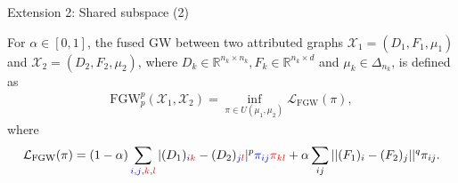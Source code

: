 \documentclass{beamer}
\newcommand{\fgw}{\text{FGW}}
\newcommand{\cX}{\mathcal X}
\newcommand{\cL}{\mathcal L}
\newcommand{\bbR}{\mathbb R}
\begin{document}
\begin{frame}{Extension 2: Shared subspace (2)}
  \scriptsize
  \begin{definition}
    For $\alpha \in [0, 1]$, the fused GW between two attributed graphs
    $\cX_1 = (D_1, F_1, \mu_1)$ and $\cX_2 = (D_2, F_2, \mu_2)$,
    where $D_k \in \bbR^{n_k \times n_k}, F_k \in \bbR^{n_k \times d}$
    and $\mu_k \in \Delta_{n_k}$, is defined as
    \begin{align*}
      \fgw_p^p(\cX_1, \cX_2) = \inf_{\pi \in U(\mu_1, \mu_2)} \cL_{\fgw}(\pi),
    \end{align*}
    \vspace{-0.3cm}
    where
    \begin{align*}
      \cL_{\fgw}(\pi) = (1 - \alpha)
      \sum_{{\color{blue}{i}},{\color{blue}{j}},{\color{red}{k}},{\color{red}{l}}}
      |(D_1)_{{\color{blue}{i}} {\color{red}{k}}} - (D_2)_{{\color{blue}{j}}{\color{red}{l}}}|^p {\color{blue}{\pi_{ij}}} {\color{red}{\pi_{kl}}}
      + \alpha \sum_{ij} ||(F_1)_i - (F_2)_j||^q \pi_{ij}.
    \end{align*}
  \end{definition}



\end{frame}
\end{document}
